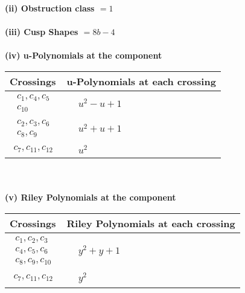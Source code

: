 \documentclass[1p]{elsarticle_modified}
\theoremstyle{definition}
\begin{document}
\flushleft \textbf{(ii) Obstruction class $= 1$}\\~\\
\flushleft \textbf{(iii) Cusp Shapes $= 8 b-4$}\\~\\
\newpage\renewcommand{\arraystretch}{1}
\flushleft \textbf{(iv) u-Polynomials at the component}\newline \\
\begin{tabular}{m{50pt}|m{274pt}}
Crossings & \hspace{64pt}u-Polynomials at each crossing \\
\hline $$\begin{aligned}c_{1},c_{4},c_{5}\\c_{10}\end{aligned}$$&$\begin{aligned}
&u^2- u+1
\end{aligned}$\\
\hline $$\begin{aligned}c_{2},c_{3},c_{6}\\c_{8},c_{9}\end{aligned}$$&$\begin{aligned}
&u^2+u+1
\end{aligned}$\\
\hline $$\begin{aligned}c_{7},c_{11},c_{12}\end{aligned}$$&$\begin{aligned}
&u^2
\end{aligned}$\\
\hline
\end{tabular}\\~\\
\newpage\renewcommand{\arraystretch}{1}
\flushleft \textbf{(v) Riley Polynomials at the component}\newline \\
\begin{tabular}{m{50pt}|m{274pt}}
Crossings & \hspace{64pt}Riley Polynomials at each crossing \\
\hline $$\begin{aligned}c_{1},c_{2},c_{3}\\c_{4},c_{5},c_{6}\\c_{8},c_{9},c_{10}\end{aligned}$$&$\begin{aligned}
&y^2+y+1
\end{aligned}$\\
\hline $$\begin{aligned}c_{7},c_{11},c_{12}\end{aligned}$$&$\begin{aligned}
&y^2
\end{aligned}$\\
\hline
\end{tabular}\\~\\
\end{document}
